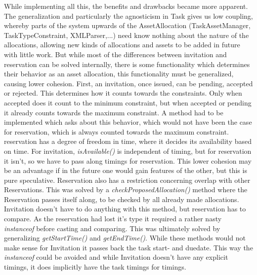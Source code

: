 				While implementing all this, the benefits and drawbacks became more apparent. The generalization and particularly the agnosticism in Task gives us low coupling, whereby parts of the system upwards of the AssetAllocation (TaskAssetManager, TaskTypeConstraint, XMLParser,...) need know nothing about the nature of the allocations, allowing new kinds of allocations and assets to be added in future with little work. But while most of the differences between invitation and reservation can be solved internally, there is some functionality which determines their behavior as an asset allocation, this functionality must be generalized, causing lower cohesion. First, an invitation, once issued, can be pending, accepted or rejected. This determines how it counts towards the constraints. Only when accepted does it count to the minimum constraint, but when accepted or pending it already counts towards the maximum constraint. A method had to be implemented which asks about this behavior, which would not have been the case for reservation, which is always counted towards the maximum constraint. reservation has a degree of freedom in time, where it decides its availability based on time. For invitation, \emph{isAvailable()} is independent of timing, but for reservation it isn't, so we have to pass along timings for reservation. This lower cohesion may be an advantage if in the future one would gain features of the other, but this is pure speculative. Reservation also has a restriction concerning overlap with other Reservations. This was solved by a \emph{checkProposedAllocation()} method where the Reservation passes itself along, to be checked by all already made allocations. Invitation doesn't have to do anything with this method, but reservation has to compare. As the reservation had lost it's type it required a rather nasty \emph{instanceof} before casting and comparing. This was ultimately solved by generalizing \emph{getStartTime()} and \emph{getEndTime()}. While these methods would not make sense for Invitation it passes back the task start- and duedate. This way the \emph{instanceof} could be avoided and while Invitation doesn't have any explicit timings, it does implicitly have the task timings for timings. 


